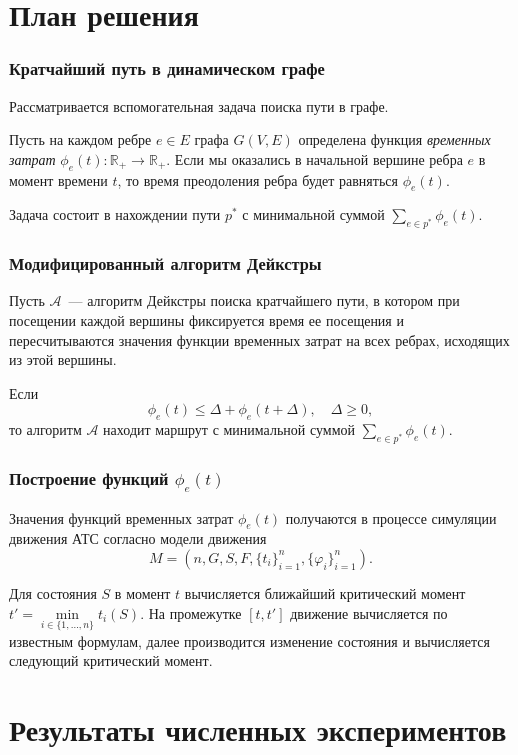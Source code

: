 \documentclass{beamer}
\begin{document}
\section{План решения}

\begin{frame}\frametitle{Кратчайший путь в динамическом графе}
  Рассматривается вспомогательная задача поиска пути в графе.
  
  Пусть на каждом ребре $e \in E$ графа $G(V, E)$ определена функция \textit{временных затрат} $\phi_e(t) : \mathbb {R}_+ \rightarrow \mathbb {R}_+$. Если мы оказались в начальной вершине ребра $e$ в момент времени $t$, то время преодоления ребра будет равняться $\phi_e(t)$.

  Задача состоит в нахождении пути $p^*$ с минимальной суммой $\sum_{e\in p^*}\phi_e(t)$.
\end{frame}

\begin{frame}\frametitle{Модифицированный алгоритм Дейкстры}

  Пусть $\mathcal{A}$~--- алгоритм Дейкстры поиска кратчайшего пути, в котором при посещении каждой вершины фиксируется время ее посещения и пересчитываются значения функции временных затрат на всех ребрах, исходящих из этой вершины.

  \begin{theorem}
    Если $$ \phi_e(t) \leq \Delta + \phi_e(t + \Delta), \quad \Delta \ge 0,$$
    то алгоритм $\mathcal{A}$ находит маршрут с минимальной суммой $\sum_{e\in p^*}\phi_e(t)$.
  \end{theorem}
\end{frame}

\begin{frame}\frametitle{Построение функций $\phi_e(t)$}
  Значения функций временных затрат $\phi_e(t)$ получаются в процессе симуляции движения АТС согласно модели движения
  $$M = \left(n, G, S, F, \{t_i\}_{i = 1}^n, \{\varphi_i\}_{i = 1}^n \right).$$

  Для состояния $S$ в момент $t$ вычисляется ближайший критический момент $t'=\min\limits_{i\in\{1,\ldots,n\}} t_i(S)$. На промежутке $[t, t']$ движение вычисляется по известным формулам, далее производится изменение состояния и вычисляется следующий критический момент.
\end{frame}

\section{Результаты численных экспериментов}
\end{document}
